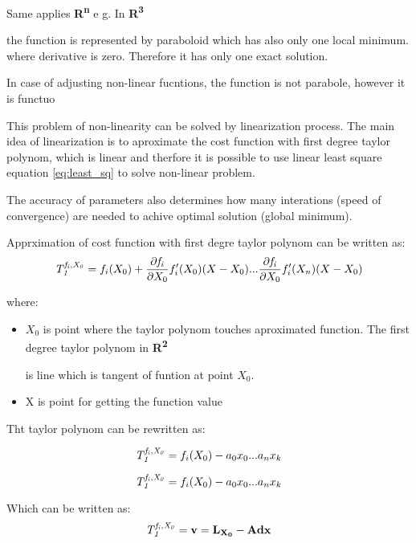 \documentclass[a4paper,12pt]{report}
\newcommand{\ematr}[1]{
{\bf #1}
}
\newcommand{\evect}[1]{
{\bf #1}
}
\newcommand{\eucl}[1]{
{\bf R\textsuperscript{#1}}
}
\newcommand{\efunc}[1]{
{\it #1}
}
\begin{document}
Same applies \eucl{n} e g. In \eucl{3} 
the function is represented by paraboloid which has also only one local minimum.
where derivative is zero. Therefore it has only one exact solution. 

In case of adjusting non-linear fucntions, the function \label{eq:least_be_part} is not parabole, however 
it is functuo

This problem of non-linearity can be solved by linearization process.
The main idea of linearization is to aproximate the cost function with first degree taylor polynom,
which is linear and therfore it is possible to use linear least square equation \eqref{eq:least_sq} 
to solve non-linear problem. 

The accuracy of parameters also determines how many interations (speed of convergence) are needed to achive optimal solution (global minimum).


Apprximation of cost function with first degre taylor polynom can be written as:
\begin{equation}
\efunc{T^{f_{i}, X_{0}}_{1}} = f_{i}(X_{0}) + \frac{\partial \efunc{f_{i}}}{\partial {X_{0}}} f_{i}'(X_{0}) (X -  X_{0}) 
... \frac{\partial \efunc{f_{i}}}{\partial {X_{0}}} f_{i}'(X_{n}) (X -  X_{0}) 
\end{equation}

where:
\begin{itemize}
\item $X_{0}$ is point where the taylor polynom touches aproximated function. The first degree taylor polynom in \eucl{2} 
      is line which is tangent of funtion at point $X_{0}$. 
\item X is point for getting the function value
\end{itemize}


Tht taylor polynom can be rewritten as:

\begin{equation}
\efunc{T^{f_{i}, X_{0}}_{1}} = f_{i}(X_{0}) - a_{0} x_{0} ... a_{n} x_{k} 
\end{equation} 

\begin{equation}
\efunc{T^{f_{i}, X_{0}}_{1}} = f_{i}(X_{0}) - a_{0} x_{0} ... a_{n} x_{k}
\end{equation} 

Which can be written as:
\begin{equation}
\efunc{T^{f_{i}, X_{0}}_{1}} = \evect{v} = \evect{L_{X_{0}}} - \ematr{A}\evect{dx}
\end{equation} 
\end{document}
